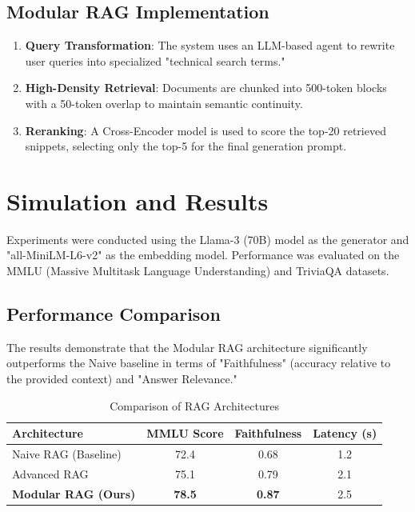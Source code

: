 \documentclass[11pt,a4paper,oneside]{report}
\begin{document}
\section{Modular RAG Implementation}
\begin{enumerate}
    \item \textbf{Query Transformation}: The system uses an LLM-based agent to rewrite user queries into specialized "technical search terms."
    \item \textbf{High-Density Retrieval}: Documents are chunked into 500-token blocks with a 50-token overlap to maintain semantic continuity.
    \item \textbf{Reranking}: A Cross-Encoder model is used to score the top-20 retrieved snippets, selecting only the top-5 for the final generation prompt.
\end{enumerate}

\chapter{Simulation and Results}
\label{ch:results}

Experiments were conducted using the Llama-3 (70B) model as the generator and "all-MiniLM-L6-v2" as the embedding model. Performance was evaluated on the MMLU (Massive Multitask Language Understanding) and TriviaQA datasets.

\section{Performance Comparison}
The results demonstrate that the Modular RAG architecture significantly outperforms the Naive baseline in terms of "Faithfulness" (accuracy relative to the provided context) and "Answer Relevance."

\begin{table}[h!]
\centering
\begin{tabular}{@{}lccc@{}}
\toprule
\textbf{Architecture} & \textbf{MMLU Score} & \textbf{Faithfulness} & \textbf{Latency (s)} \\ \midrule
Naive RAG (Baseline)           & 72.4 & 0.68 & 1.2 \\
Advanced RAG                   & 75.1 & 0.79 & 2.1 \\
\textbf{Modular RAG (Ours)}    & \textbf{78.5} & \textbf{0.87} & 2.5 \\ \bottomrule
\end{tabular}
\caption{Comparison of RAG Architectures}
\label{tab:results}
\end{table}
\end{document}
